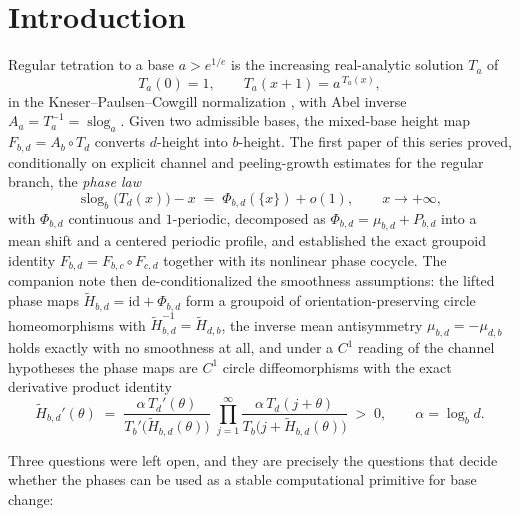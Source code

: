 \documentclass[11pt,a4paper]{article}
\theoremstyle{definition}
\theoremstyle{remark}
\newcommand{\slog}{\operatorname{slog}}
\begin{document}
\section{Introduction}\label{sec:intro}

Regular tetration to a base $a>e^{1/e}$ is the increasing real-analytic solution $T_a$ of
\begin{equation}\label{eq:tetration}
T_a(0)=1,\qquad T_a(x+1)=a^{\,T_a(x)},
\end{equation}
in the Kneser--Paulsen--Cowgill normalization \cite{kneser,kouznetsov,paulsencowgill,paulsen},
with Abel inverse $A_a=T_a^{-1}=\slog_a$. Given two admissible bases, the mixed-base height map
$F_{b,d}=A_b\circ T_d$ converts $d$-height into $b$-height. The first paper of this series
\cite{phaselaw} proved, conditionally on explicit channel and peeling-growth estimates for the
regular branch, the \emph{phase law}
\begin{equation}\label{eq:phaselaw}
\slog_b\bigl(T_d(x)\bigr)-x \;=\; \Phi_{b,d}(\{x\})+o(1),\qquad x\to+\infty,
\end{equation}
with $\Phi_{b,d}$ continuous and $1$-periodic, decomposed as
$\Phi_{b,d}=\mu_{b,d}+P_{b,d}$ into a mean shift and a centered periodic profile, and
established the exact groupoid identity $F_{b,d}=F_{b,c}\circ F_{c,d}$ together with its
nonlinear phase cocycle. The companion note \cite{unified} then de-conditionalized the
smoothness assumptions: the lifted phase maps $\widetilde H_{b,d}=\mathrm{id}+\Phi_{b,d}$ form a
groupoid of orientation-preserving circle homeomorphisms with
$\widetilde H_{b,d}^{-1}=\widetilde H_{d,b}$, the inverse mean antisymmetry
$\mu_{b,d}=-\mu_{d,b}$ holds exactly with no smoothness at all, and under a $C^1$ reading of
the channel hypotheses the phase maps are $C^1$ circle diffeomorphisms with the exact
derivative product identity
\begin{equation}\label{eq:product}
\widetilde H_{b,d}'(\theta)\;=\;\frac{\alpha\,T_d'(\theta)}{T_b'\bigl(\widetilde
H_{b,d}(\theta)\bigr)}\;\prod_{j=1}^{\infty}\frac{\alpha\,T_d(j+\theta)}{T_b\bigl(j+\widetilde
H_{b,d}(\theta)\bigr)}\;>\;0,\qquad \alpha=\log_b d .
\end{equation}

Three questions were left open, and they are precisely the questions that decide whether the
phases can be used as a stable computational primitive for base change:
\end{document}
